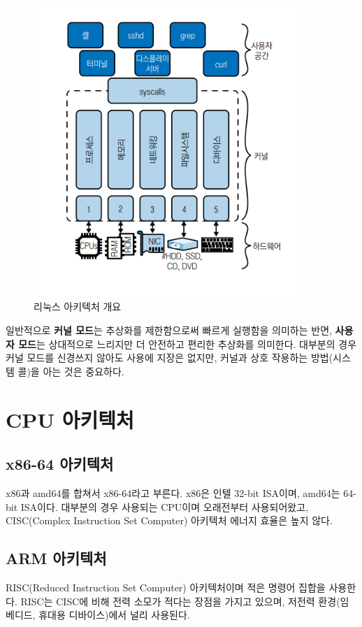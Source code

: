 \begin{figure}
    \centering
    \includegraphics[width=10cm]{resource/2-1.png}
    \caption{리눅스 아키텍처 개요}
\end{figure}
\begin{flushleft}
    일반적으로 \textbf{커널 모드}는 추상화를 제한함으로써 빠르게 실행함을 의미하는 반면, 
    \textbf{사용자 모드}는 상대적으로 느리지만 더 안전하고 편리한 추상화를 의미한다.
    대부분의 경우 커널 모드를 신경쓰지 않아도 사용에 지장은 없지만, 
    커널과 상호 작용하는 방법(시스템 콜)을 아는 것은 중요하다.
\end{flushleft}


\section{CPU 아키텍처}
\subsection{x86-64 아키텍처}
\begin{flushleft}
    x86과 amd64를 합쳐서 x86-64라고 부른다. 
    x86은 인텔 32-bit ISA이며, amd64는 64-bit ISA이다.
    대부분의 경우 사용되는 CPU이며 오래전부터 사용되어왔고, 
    CISC(Complex Instruction Set Computer) 아키텍처 에너지 효율은 높지 않다.
\end{flushleft}

\subsection{ARM 아키텍처}
\begin{flushleft}
    RISC(Reduced Instruction Set Computer) 아키텍처이며 적은 명령어 집합을 사용한다.
    RISC는 CISC에 비해 전력 소모가 적다는 장점을 가지고 있으며, 
    저전력 환경(임베디드, 휴대용 디바이스)에서 널리 사용된다.
\end{flushleft}


